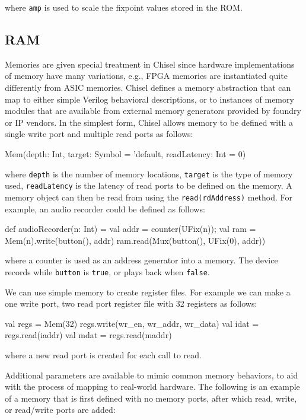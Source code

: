\documentclass[10pt]{article}
\begin{document}
\noindent
where \verb+amp+ is used to scale the fixpoint values stored in the ROM.

\subsection{RAM}


Memories are given special treatment in Chisel since hardware
implementations of memory have many variations, e.g., FPGA memories
are instantiated quite differently from ASIC memories.  Chisel defines
a memory abstraction that can map to either simple Verilog behavioral
descriptions, or to instances of memory modules that are available
from external memory generators provided by foundry or IP vendors.  In
the simplest form, Chisel allows memory to be defined with a single
write port and multiple read ports as follows:

\begin{scala}
  Mem(depth: Int, 
      target: Symbol = 'default, readLatency: Int = 0)
\end{scala}

\noindent
where \verb+depth+ is the number of memory locations, \verb+target+ is the
type of memory used, \verb+readLatency+ is the latency of read ports to be
defined on the memory.
A memory object can then
be read from using the \verb+read(rdAddress)+ method.  For example, an
audio recorder could be defined as follows:

\begin{scala}
  def audioRecorder(n: Int) = { 
    val addr = counter(UFix(n));
    val ram = Mem(n).write(button(), addr)
    ram.read(Mux(button(), UFix(0), addr))
  } 
\end{scala}

\noindent
where a counter is used as an address generator into a memory.  
The device records while \verb+button+ is \verb+true+, or plays back when \verb+false+.

We can use simple memory to create register files.
For example we can make a one write port, two read port register file with 32 registers as follows:

\begin{scala}
  val regs = Mem(32)
  regs.write(wr_en, wr_addr, wr_data)
  val idat = regs.read(iaddr)
  val mdat = regs.read(maddr)
\end{scala}

\noindent
where a new read port is created for each call to read.

Additional parameters are available to mimic common memory behaviors,
to aid with the process of mapping to real-world hardware.  The
following is an example of a memory that is first defined with no
memory ports, after which read, write, or read/write ports are added:
\end{document}
